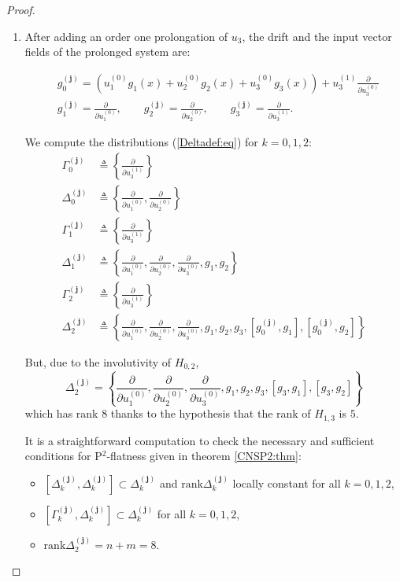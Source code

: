 \documentclass[10pt]{article}
\newcommand{\3}{\mathbf{3}}
\newcommand{\2}{\mathbf{2}}
\newcommand{\1}{\mathbf{1}}
\newcommand{\0}{\mathbf{0}}
\newcommand{\mbf}[1]{\mathbf{#1}}
\newcommand{\rk}{\mathrm{rank}}
\newcommand{\ddu}[2]{\frac{\partial}{\partial u_{#1}^{(#2)}}}
\begin{document}
\begin{proof}

\begin{enumerate}
  \item After adding an order one prolongation of $u_3$, the drift and the input vector fields  of the prolonged system are:

\begin{equation}\label{prolvecfields5states:eq}
\begin{aligned}
&g_{0}^{(\mbf{j})}= \left(u_{1}^{(0)}g_{1}(x) + u_{2}^{(0)}g_{2}(x) + u_{3}^{(0)}g_{3}(x)\right) +   u_{3}^{(1)}\ddu{3}{0}\\
&g_{1}^{(\mbf{j})}= \ddu{1}{0}, \qquad g_{2}^{(\mbf{j})}= \ddu{2}{0}, \qquad g_{3}^{(\mbf{j})}= \ddu{3}{1}.
\end{aligned}
\end{equation}

We compute the distributions (\ref{Deltadef:eq}) for $k=0,1,2$:
\begin{equation}
\begin{aligned}
 \Gamma_{0}^{(\mbf{j})} &\triangleq \left\{ \ddu{3}{1} \right\} \\
\Delta_{0}^{(\mbf{j})} &\triangleq \left\{ \ddu{1}{0}  , \ddu{2}{0} \right\}\\
\Gamma_{1}^{(\mbf{j})} &\triangleq \left\{ \ddu{3}{1} \right\} \\
\Delta_{1}^{(\mbf{j})} &\triangleq \left\{ \ddu{1}{0}  , \ddu{2}{0}, \ddu{3}{0}, g_1, g_2 \right\}\\
\Gamma_{2}^{(\mbf{j})} &\triangleq \left\{ \ddu{3}{1} \right\} \\
\Delta_{2}^{(\mbf{j})} &\triangleq \left\{ \ddu{1}{0}  , \ddu{2}{0}, \ddu{3}{0}, g_1, g_2,g_3,[g_0^{(\mbf{j})},g_1], [g_0^{(\mbf{j})},g_2] \right\}
\end{aligned}
\end{equation}

But, due to the involutivity of $H_{0,2}$,
\[ \Delta_{2}^{(\mbf{j})} =\left\{ \ddu{1}{0}  , \ddu{2}{0}, \ddu{3}{0}, g_1, g_2,g_3,[g_3,g_1], [g_3,g_2] \right\} \]
which has rank $8$ thanks to the hypothesis that the rank of $H_{1,3}$ is $5$.

It is a straightforward computation to check the necessary and sufficient conditions for P$^2$-flatness given in theorem \ref{CNSP2:thm}:
\begin{itemize}
\item[(i)] $[\Delta_{k}^{(\mbf{j})}, \Delta_{k}^{(\mbf{j})}] \subset \Delta_{k}^{(\mbf{j})}$ and $\rk \Delta_{k}^{(\mbf{j})}$  locally constant for all $k=0,1,2$,
\item[(ii)]$[\Gamma_{k}^{(\mbf{j})}, \Delta_{k}^{(\mbf{j})}] \subset \Delta_{k}^{(\mbf{j})}$ for all $k=0,1,2$,
\item[(iii)] $\rk \Delta_{2}^{(\mbf{j})} = n+m=8$.
\end{itemize}


\end{enumerate}
\end{proof}
\end{document}
